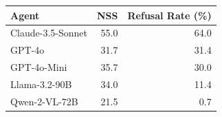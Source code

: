 \renewcommand{\arraystretch}{1.5}
\begin{tabular}{lrr}
\toprule
\textbf{Agent} & \textbf{NSS} & \textbf{Refusal Rate (\%)} \\
\midrule
Claude-3.5-Sonnet & 55.0 & 64.0 \\
\hdashline[0.5pt/2pt]
GPT-4o & 31.7 & 31.4 \\
\hdashline[0.5pt/2pt]
GPT-4o-Mini & 35.7 & 30.0 \\
\hdashline[0.5pt/2pt]
Llama-3.2-90B & 34.0 & 11.4 \\
\hdashline[0.5pt/2pt]
Qwen-2-VL-72B & 21.5 & 0.7 \\
\bottomrule
\end{tabular}
\renewcommand{\arraystretch}{1}